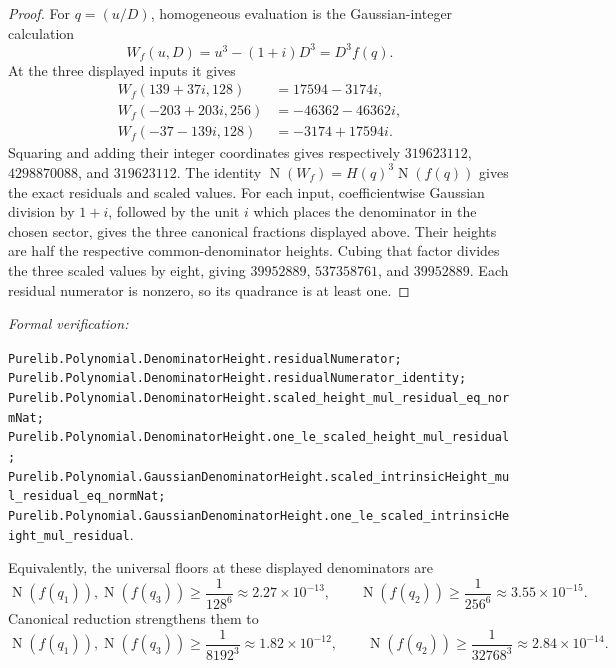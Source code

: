 \documentclass[11pt]{article}
\newcommand{\Norm}[1]{\operatorname{N}\!\left(#1\right)}
\newcommand{\leanref}[1]{\par\smallskip\noindent
  \emph{Formal verification:}\par\nobreak
  {\raggedright\nolinkurl{#1}.\par}}
\begin{document}
\begin{proof}
For $q=(u/D)$, homogeneous evaluation is the Gaussian-integer calculation
\[
             W_f(u,D)=u^3-(1+i)D^3=D^3f(q).
\]
At the three displayed inputs it gives
\[
 \begin{aligned}
 W_f(139+37i,128)&=17594-3174i,\\
 W_f(-203+203i,256)&=-46362-46362i,\\
 W_f(-37-139i,128)&=-3174+17594i.
 \end{aligned}
\]
Squaring and adding their integer coordinates gives respectively
$319623112$, $4298870088$, and $319623112$.  The identity
$\Norm{W_f}=H(q)^3\Norm{f(q)}$ gives the exact residuals and scaled values.
For each input, coefficientwise Gaussian division by $1+i$, followed by the
unit $i$ which places the denominator in the chosen sector, gives the three
canonical fractions displayed above.  Their heights are half the respective
common-denominator heights.  Cubing that factor divides the three scaled
values by eight, giving $39952889$, $537358761$, and $39952889$.
Each residual numerator is nonzero, so its quadrance is at least one.
\end{proof}

\leanref{Purelib.Polynomial.DenominatorHeight.residualNumerator;
Purelib.Polynomial.DenominatorHeight.residualNumerator_identity;
Purelib.Polynomial.DenominatorHeight.scaled_height_mul_residual_eq_normNat;
Purelib.Polynomial.DenominatorHeight.one_le_scaled_height_mul_residual;
Purelib.Polynomial.GaussianDenominatorHeight.scaled_intrinsicHeight_mul_residual_eq_normNat;
Purelib.Polynomial.GaussianDenominatorHeight.one_le_scaled_intrinsicHeight_mul_residual}

Equivalently, the universal floors at these displayed denominators are
\[
 \Norm{f(q_1)},\Norm{f(q_3)}\ge\frac1{128^6}
       \approx2.27\mathbin{\times}10^{-13},
 \qquad
 \Norm{f(q_2)}\ge\frac1{256^6}
       \approx3.55\mathbin{\times}10^{-15}.
\]
Canonical reduction strengthens them to
\[
 \Norm{f(q_1)},\Norm{f(q_3)}\ge\frac1{8192^3}
       \approx1.82\mathbin{\times}10^{-12},
 \qquad
 \Norm{f(q_2)}\ge\frac1{32768^3}
       \approx2.84\mathbin{\times}10^{-14}.
\]
\end{document}
